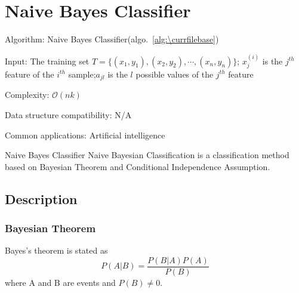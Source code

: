 \documentclass[catalog.tex]{subfiles}
\begin{document}
\def\pbname{Naive Bayes Classifier} %

\section{\pbname} 

\begin{overview}
\item [Algorithm:] Naive Bayes Classifier(algo.~\ref{alg:\currfilebase}) 
\item [Input:] The training set $T = \{(x_1,y_1), (x_2, y_2), \cdots, (x_n,y_n)\}$; $x_j^{(i)}$ is the $j^{th}$ feature of the $i^{th}$ sample;$a_{jl}$ is the $l$ possible values of the $j^{th}$ feature
\item [Complexity:] $\mathcal{O}(nk)$
\item [Data structure compatibility:] N/A 
\item [Common applications:] Artificial intelligence
\end{overview}


\begin{problem}{\pbname}
	Naive Bayesian Classification is a classification method based on Bayesian Theorem and Conditional Independence Assumption.
\end{problem}


\subsection*{Description}
\subsubsection{Bayesian Theorem}
Bayes's theorem is stated as\cite{10.5555/59556}
\begin{equation}
P(A|B) = \frac{P(B|A)P(A)}{P(B)}
\end{equation}
where A and B are events and $P(B)\neq0$.
\end{document}
